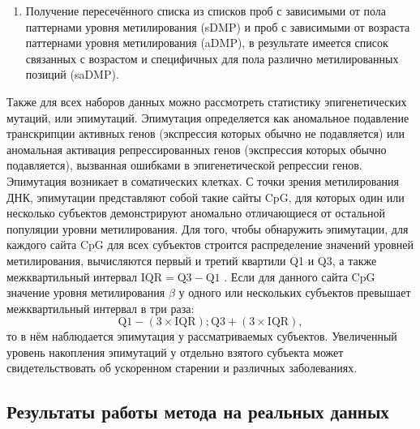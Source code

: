 \begin{enumerate}
	\item Получение пересечённого списка из списков проб с зависимыми от пола паттернами уровня метилирования (sDMP) и проб с зависимыми от возраста паттернами уровня метилирования (aDMP), в результате имеется список связанных с возрастом и специфичных для пола различно метилированных позиций (saDMP).
\end{enumerate}

Также для всех наборов данных можно рассмотреть статистику эпигенетических мутаций, или эпимутаций. Эпимутация определяется как аномальное подавление транскрипции активных генов (экспрессия которых обычно не подавляется) или аномальная активация репрессированных генов (экспрессия которых обычно подавляется), вызванная ошибками в эпигенетической репрессии генов. Эпимутация возникает в соматических клетках. С точки зрения метилирования ДНК, эпимутации представляют собой такие сайты CpG, для которых один или несколько субъектов демонстрируют аномально отличающиеся от остальной популяции уровни метилирования. Для того, чтобы обнаружить эпимутации, для каждого сайта CpG для всех субъектов строится распределение значений уровней метилирования, вычисляются первый и третий квартили Q1 и Q3, а также межквартильный интервал $\text{IQR} = \text{Q3} - \text{Q1}$ \autocite{Gentilini2015}. Если для данного сайта CpG значение уровня метилирования $\beta$ у одного или нескольких субъектов превышает межквартильный интервал в три раза:
\begin{equation}
\label{eq:iqr}
\text{Q1} - (3 \times \text{IQR}); \text{Q3} + (3 \times \text{IQR}), 
\end{equation}
то в нём наблюдается эпимутация у рассматриваемых субъектов. Увеличенный уровень накопления эпимутаций у отдельно взятого субъекта может свидетельствовать об ускоренном старении и различных заболеваниях.

\subsection{Результаты работы метода на реальных данных}\label{subsec:ch2/sec2/subsec2}

